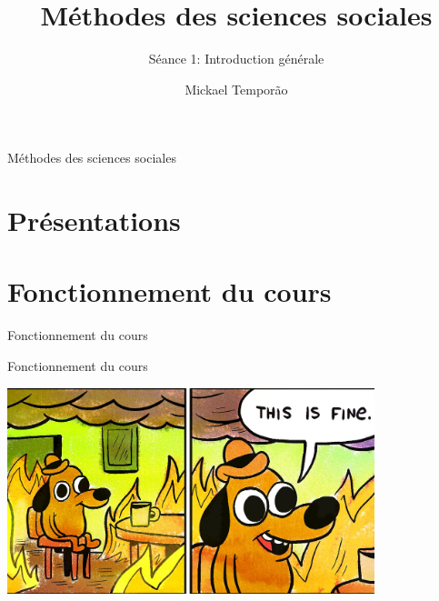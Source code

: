 \documentclass[10pt]{beamer}
\title{Méthodes des sciences sociales}
\subtitle{Séance 1: Introduction générale}
\author{Mickael Temporão}
\institute{\faTwitter~$@$mickaeltemporao}
\date{}
\begin{document}
\maketitle

\begin{frame}{Méthodes des sciences sociales}
    \vspace{24pt}
\end{frame}

\section{Présentations}
\section{Fonctionnement du cours}

\begin{frame}{Fonctionnement du cours}
\end{frame}

\begin{frame}{Fonctionnement du cours}
    \begin{center}
    \includegraphics[height=6cm, trim=0 0.5 3.7cm .5, clip]{fine.jpg}
    \end{center}
\end{frame}
\end{document}
